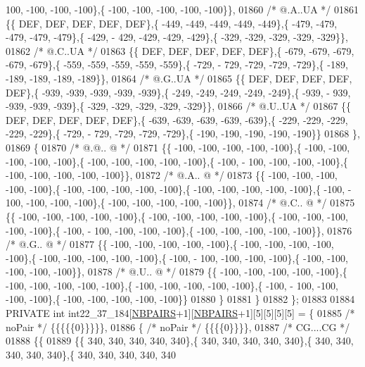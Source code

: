 \begin{DoxyCode}
      100, -100, -100, -100\},\{ -100, -100, -100, -100, -100\}\},
01860 \textcolor{comment}{/*  @.A..UA */}
01861 \{\{  DEF,  DEF,  DEF,  DEF,  DEF\},\{ -449, -449, -449, -449, -449\},\{ -479, -479, -479, -479, -479\},\{ -429, -
      429, -429, -429, -429\},\{ -329, -329, -329, -329, -329\}\},
01862 \textcolor{comment}{/*  @.C..UA */}
01863 \{\{  DEF,  DEF,  DEF,  DEF,  DEF\},\{ -679, -679, -679, -679, -679\},\{ -559, -559, -559, -559, -559\},\{ -729, -
      729, -729, -729, -729\},\{ -189, -189, -189, -189, -189\}\},
01864 \textcolor{comment}{/*  @.G..UA */}
01865 \{\{  DEF,  DEF,  DEF,  DEF,  DEF\},\{ -939, -939, -939, -939, -939\},\{ -249, -249, -249, -249, -249\},\{ -939, -
      939, -939, -939, -939\},\{ -329, -329, -329, -329, -329\}\},
01866 \textcolor{comment}{/*  @.U..UA */}
01867 \{\{  DEF,  DEF,  DEF,  DEF,  DEF\},\{ -639, -639, -639, -639, -639\},\{ -229, -229, -229, -229, -229\},\{ -729, -
      729, -729, -729, -729\},\{ -190, -190, -190, -190, -190\}\}
01868 \},
01869 \{
01870 \textcolor{comment}{/*  @.@.. @ */}
01871 \{\{ -100, -100, -100, -100, -100\},\{ -100, -100, -100, -100, -100\},\{ -100, -100, -100, -100, -100\},\{ -100, -
      100, -100, -100, -100\},\{ -100, -100, -100, -100, -100\}\},
01872 \textcolor{comment}{/*  @.A.. @ */}
01873 \{\{ -100, -100, -100, -100, -100\},\{ -100, -100, -100, -100, -100\},\{ -100, -100, -100, -100, -100\},\{ -100, -
      100, -100, -100, -100\},\{ -100, -100, -100, -100, -100\}\},
01874 \textcolor{comment}{/*  @.C.. @ */}
01875 \{\{ -100, -100, -100, -100, -100\},\{ -100, -100, -100, -100, -100\},\{ -100, -100, -100, -100, -100\},\{ -100, -
      100, -100, -100, -100\},\{ -100, -100, -100, -100, -100\}\},
01876 \textcolor{comment}{/*  @.G.. @ */}
01877 \{\{ -100, -100, -100, -100, -100\},\{ -100, -100, -100, -100, -100\},\{ -100, -100, -100, -100, -100\},\{ -100, -
      100, -100, -100, -100\},\{ -100, -100, -100, -100, -100\}\},
01878 \textcolor{comment}{/*  @.U.. @ */}
01879 \{\{ -100, -100, -100, -100, -100\},\{ -100, -100, -100, -100, -100\},\{ -100, -100, -100, -100, -100\},\{ -100, -
      100, -100, -100, -100\},\{ -100, -100, -100, -100, -100\}\}
01880 \}
01881 \}
01882 \};
01883 
01884 PRIVATE \textcolor{keywordtype}{int} int22\_37\_184[\hyperlink{constants_8h_a5e75221c779d618eab81e096f37e32ce}{NBPAIRS}+1][\hyperlink{constants_8h_a5e75221c779d618eab81e096f37e32ce}{NBPAIRS}+1][5][5][5][5] = \{
01885 \textcolor{comment}{/* noPair */} \{\{\{\{\{0\}\}\}\}\},
01886 \{ \textcolor{comment}{/* noPair */} \{\{\{\{0\}\}\}\},
01887 \textcolor{comment}{/* CG....CG */}
01888 \{\{
01889 \{\{ 340, 340, 340, 340, 340\},\{ 340, 340, 340, 340, 340\},\{ 340, 340, 340, 340, 340\},\{ 340, 340, 340, 340, 340

\end{DoxyCode}
